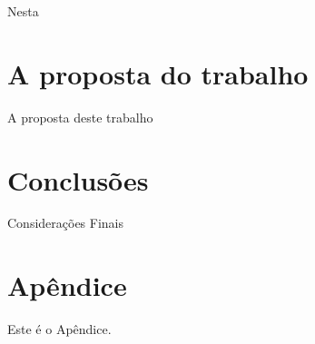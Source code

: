 \documentclass[eso]{bcc}
\begin{document}
Nesta

\chapter{A proposta do trabalho}
\label{chap:sistema}
A proposta deste trabalho

\chapter{Conclusões}
\label{chap:conclusao}

Considerações Finais


\nocite{*} %



\appendix
\chapter{Apêndice}\label{ane:relatorio}
Este é o Apêndice.
\end{document}
